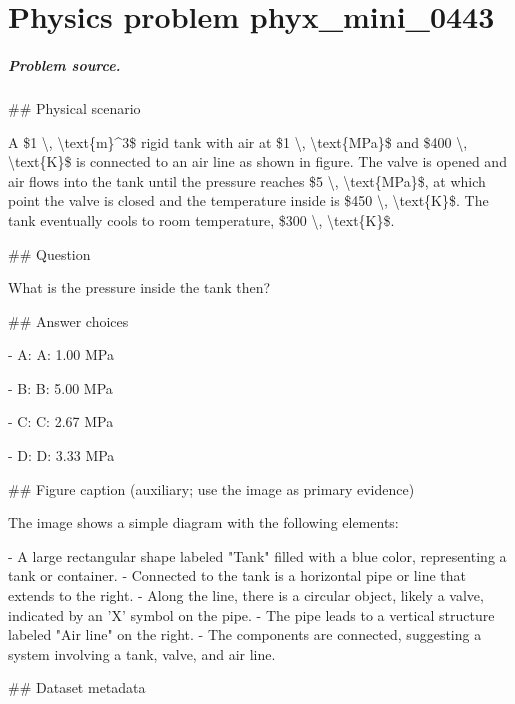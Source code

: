 
\chapter{Physics problem phyx\_mini\_0443}
\label{ch:PhyXMiniProblems_problem_phyx_mini_0443}

\paragraph{Problem source.}
\#\# Physical scenario

A \$1 \textbackslash{}, \textbackslash{}text\{m\}\textasciicircum{}3\$ rigid tank with air at \$1 \textbackslash{}, \textbackslash{}text\{MPa\}\$ and \$400 \textbackslash{}, \textbackslash{}text\{K\}\$ is connected to an air line as shown in figure. The valve is opened and air flows into the tank until the pressure reaches \$5 \textbackslash{}, \textbackslash{}text\{MPa\}\$, at which point the valve is closed and the temperature inside is \$450 \textbackslash{}, \textbackslash{}text\{K\}\$. The tank eventually cools to room temperature, \$300 \textbackslash{}, \textbackslash{}text\{K\}\$.

\#\# Question

What is the pressure inside the tank then?

\#\# Answer choices

- A: A: 1.00 MPa

- B: B: 5.00 MPa

- C: C: 2.67 MPa

- D: D: 3.33 MPa

\#\# Figure caption (auxiliary; use the image as primary evidence)

The image shows a simple diagram with the following elements:

- A large rectangular shape labeled "Tank" filled with a blue color, representing a tank or container.
- Connected to the tank is a horizontal pipe or line that extends to the right.
- Along the line, there is a circular object, likely a valve, indicated by an 'X' symbol on the pipe.
- The pipe leads to a vertical structure labeled "Air line" on the right.
- The components are connected, suggesting a system involving a tank, valve, and air line.

\#\# Dataset metadata

